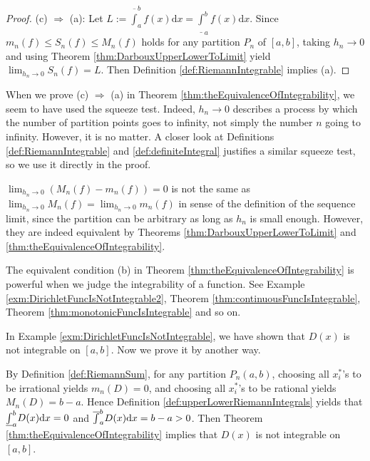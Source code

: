 \begin{proof}
  (c) $\Rightarrow$ (a):
  Let $L:=\overline{\int}_{a}^{b}f(x)\mathrm{d}x=
  \underline{\int}_{a}^{b}f(x)\mathrm{d}x$.
  Since $m_{n}(f)\le S_{n}(f)\le M_{n}(f)$ holds
  for any partition $P_{n}$ of $[a,b]$,
  taking $h_{n}\rightarrow 0$ and
  using Theorem \ref{thm:DarbouxUpperLowerToLimit} yield
  $\lim_{h_{n}\rightarrow 0}S_{n}(f)=L$.
  Then Definition \ref{def:RiemannIntegrable} implies (a).
\end{proof}

\begin{rem}
  When we prove (c) $\Rightarrow$ (a) in Theorem
  \ref{thm:theEquivalenceOfIntegrability},
  we seem to have used the squeeze test.
  Indeed, $h_{n}\rightarrow 0$ describes a process by which 
  the number of partition points goes to infinity,
  not simply the number $n$ going to infinity. However, it is no matter.
  A closer look at Definitions \ref{def:RiemannIntegrable} and
  \ref{def:definiteIntegral} justifies
  a similar squeeze test, so we use it directly in the proof.
\end{rem}

\begin{rem} 
  $\lim_{h_{n}\rightarrow 0}(M_{n}(f)-m_{n}(f))=0$ is not the same as
  $\lim_{h_{n}\rightarrow 0}M_{n}(f)=\lim_{h_{n}\rightarrow 0}m_{n}(f)$
  in sense of the definition of the sequence limit, since
  the partition can be arbitrary as long as
  $h_{n}$ is small enough. However, they are indeed equivalent by
  Theorems \ref{thm:DarbouxUpperLowerToLimit} and
  \ref{thm:theEquivalenceOfIntegrability}.
\end{rem}

\begin{rem}
  The equivalent condition (b) in
  Theorem \ref{thm:theEquivalenceOfIntegrability}
  is powerful when we judge the integrability
  of a function. See Example \ref{exm:DirichletFuncIsNotIntegrable2},
  Theorem \ref{thm:continuousFuncIsIntegrable},
  Theorem \ref{thm:monotonicFuncIsIntegrable} and so on.
\end{rem}

\begin{exm}
  \label{exm:DirichletFuncIsNotIntegrable2}
  In Example \ref{exm:DirichletFuncIsNotIntegrable},
  we have shown that $D(x)$ is not integrable on $[a,b]$. Now we prove
  it by another way.
  
  By Definition \ref{def:RiemannSum}, for any partition $P_{n}(a,b)$,
  choosing all $x_{i}^{*}$'s to be irrational yields
  $m_{n}(D)=0$, and choosing all $x_{i}^{*}$'s to be rational yields
  $M_{n}(D)=b-a$. Hence Definition
  \ref{def:upperLowerRiemannIntegrals} yields that
  $\underline{\int}_{a}^{b}D(x)\mathrm{d} x=0$ and
  $\overline{\int}_{a}^{b}D(x)\mathrm{d} x=b-a>0$. Then Theorem
  \ref{thm:theEquivalenceOfIntegrability} implies that
  $D(x)$ is not integrable on $[a,b]$.
\end{exm}

